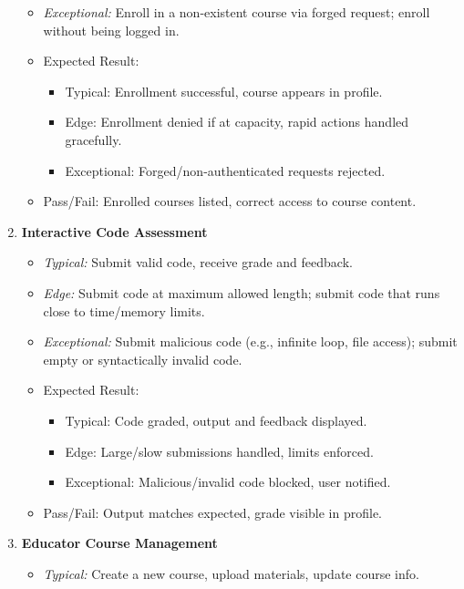 \documentclass[a4paper,11pt]{scrartcl}
\begin{document}
\begin{enumerate}[leftmargin=*]
\begin{itemize}
            \item \emph{Exceptional:} Enroll in a non-existent course via forged request; enroll without being logged in.
            \item Expected Result:
                \begin{itemize}
                  \item Typical: Enrollment successful, course appears in profile.
                  \item Edge: Enrollment denied if at capacity, rapid actions handled gracefully.
                  \item Exceptional: Forged/non-authenticated requests rejected.
                \end{itemize}
            \item Pass/Fail: Enrolled courses listed, correct access to course content.
        \end{itemize}
    \item \textbf{Interactive Code Assessment}
        \begin{itemize}
            \item \emph{Typical:} Submit valid code, receive grade and feedback.
            \item \emph{Edge:} Submit code at maximum allowed length; submit code that runs close to time/memory limits.
            \item \emph{Exceptional:} Submit malicious code (e.g., infinite loop, file access); submit empty or syntactically invalid code.
            \item Expected Result:
                \begin{itemize}
                  \item Typical: Code graded, output and feedback displayed.
                  \item Edge: Large/slow submissions handled, limits enforced.
                  \item Exceptional: Malicious/invalid code blocked, user notified.
                \end{itemize}
            \item Pass/Fail: Output matches expected, grade visible in profile.
        \end{itemize}
    \item \textbf{Educator Course Management}
        \begin{itemize}
            \item \emph{Typical:} Create a new course, upload materials, update course info.

\end{itemize}
\end{enumerate}
\end{document}
